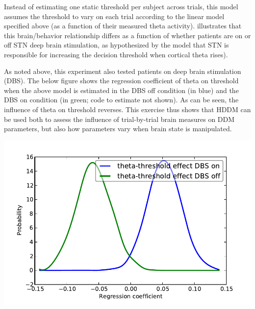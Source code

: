 \documentclass[letterpaper,10pt,english]{article}
\begin{document}
Instead of estimating one static threshold per subject across trials, this model assumes the threshold to vary on each trial according to the linear model specified above (as a function of their measured theta activity). \citet{CavanaghWieckiCohenEtAl11} illustrates that this brain/behavior relationship differs as a function of whether patients are on or off STN deep brain stimulation, as hypothesized by the model that STN is responsible for increasing the decision threshold when cortical theta rises).

As noted above, this experiment also tested patients on deep brain stimulation (DBS). The below figure shows the regression coefficient of theta on threshold when the above model is estimated in the DBS off condition (in blue) and the DBS on condition (in green; code to estimate not shown). As can be seen, the influence of theta on threshold reverses. This exercise thus shows that HDDM can be used both to assess the influence of trial-by-trial brain measures on DDM parameters, but also how parameters vary when brain state is manipulated.

\includegraphics[scale=0.6]{theta_threshold_on_off.pdf}
\end{document}
